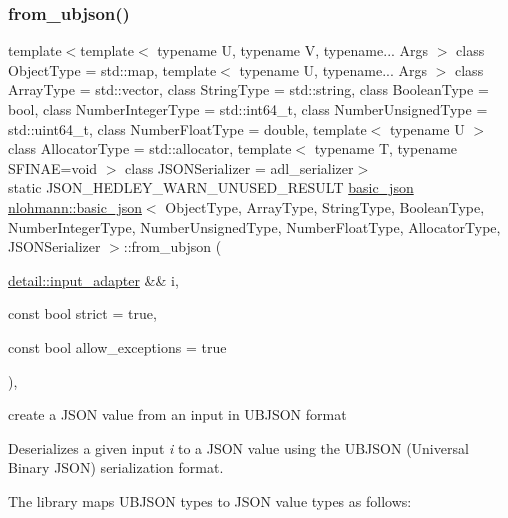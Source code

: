 \subsubsection{\texorpdfstring{from\+\_\+ubjson()}{from\_ubjson()}\hspace{0.1cm}{\footnotesize\ttfamily [1/2]}}
{\footnotesize\ttfamily template$<$template$<$ typename U, typename V, typename... Args $>$ class Object\+Type = std\+::map, template$<$ typename U, typename... Args $>$ class Array\+Type = std\+::vector, class String\+Type  = std\+::string, class Boolean\+Type  = bool, class Number\+Integer\+Type  = std\+::int64\+\_\+t, class Number\+Unsigned\+Type  = std\+::uint64\+\_\+t, class Number\+Float\+Type  = double, template$<$ typename U $>$ class Allocator\+Type = std\+::allocator, template$<$ typename T, typename S\+F\+I\+N\+A\+E=void $>$ class J\+S\+O\+N\+Serializer = adl\+\_\+serializer$>$ \\
static J\+S\+O\+N\+\_\+\+H\+E\+D\+L\+E\+Y\+\_\+\+W\+A\+R\+N\+\_\+\+U\+N\+U\+S\+E\+D\+\_\+\+R\+E\+S\+U\+LT \mbox{\hyperlink{classnlohmann_1_1basic__json}{basic\+\_\+json}} \mbox{\hyperlink{classnlohmann_1_1basic__json}{nlohmann\+::basic\+\_\+json}}$<$ Object\+Type, Array\+Type, String\+Type, Boolean\+Type, Number\+Integer\+Type, Number\+Unsigned\+Type, Number\+Float\+Type, Allocator\+Type, J\+S\+O\+N\+Serializer $>$\+::from\+\_\+ubjson (\begin{DoxyParamCaption}\item[{\mbox{\hyperlink{classnlohmann_1_1detail_1_1input__adapter}{detail\+::input\+\_\+adapter}} \&\&}]{i,  }\item[{const bool}]{strict = {\ttfamily true},  }\item[{const bool}]{allow\+\_\+exceptions = {\ttfamily true} }\end{DoxyParamCaption})\hspace{0.3cm}{\ttfamily [inline]}, {\ttfamily [static]}}



create a J\+S\+ON value from an input in U\+B\+J\+S\+ON format 

Deserializes a given input {\itshape i} to a J\+S\+ON value using the U\+B\+J\+S\+ON (Universal Binary J\+S\+ON) serialization format.

The library maps U\+B\+J\+S\+ON types to J\+S\+ON value types as follows\+:


